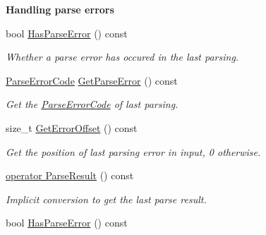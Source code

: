 \begin{Indent}{\bf Handling parse errors}\par
\begin{DoxyCompactItemize}
\item 
bool \hyperlink{class_generic_document_afe0c87d9fc13a78597360e0646479419}{Has\+Parse\+Error} () const \hypertarget{class_generic_document_afe0c87d9fc13a78597360e0646479419}{}\label{class_generic_document_afe0c87d9fc13a78597360e0646479419}

\begin{DoxyCompactList}\small\item\em Whether a parse error has occured in the last parsing. \end{DoxyCompactList}\item 
\hyperlink{group___r_a_p_i_d_j_s_o_n___e_r_r_o_r_s_ga8d4b32dfc45840bca189ade2bbcb6ba7}{Parse\+Error\+Code} \hyperlink{class_generic_document_aab4771355aa3c6e5368da3ae36f38cc1}{Get\+Parse\+Error} () const \hypertarget{class_generic_document_aab4771355aa3c6e5368da3ae36f38cc1}{}\label{class_generic_document_aab4771355aa3c6e5368da3ae36f38cc1}

\begin{DoxyCompactList}\small\item\em Get the \hyperlink{group___r_a_p_i_d_j_s_o_n___e_r_r_o_r_s_ga8d4b32dfc45840bca189ade2bbcb6ba7}{Parse\+Error\+Code} of last parsing. \end{DoxyCompactList}\item 
size\+\_\+t \hyperlink{class_generic_document_a2db6ad11d157342f725470fb898b6712}{Get\+Error\+Offset} () const \hypertarget{class_generic_document_a2db6ad11d157342f725470fb898b6712}{}\label{class_generic_document_a2db6ad11d157342f725470fb898b6712}

\begin{DoxyCompactList}\small\item\em Get the position of last parsing error in input, 0 otherwise. \end{DoxyCompactList}\item 
\hyperlink{class_generic_document_a12ce1db7b06e2565b6abb2112a681c71}{operator Parse\+Result} () const 
\begin{DoxyCompactList}\small\item\em Implicit conversion to get the last parse result. \end{DoxyCompactList}\item 
bool \hyperlink{class_generic_document_afe0c87d9fc13a78597360e0646479419}{Has\+Parse\+Error} () const \hypertarget{class_generic_document_afe0c87d9fc13a78597360e0646479419}{}\label{class_generic_document_afe0c87d9fc13a78597360e0646479419}


\end{DoxyCompactItemize}
\end{Indent}
